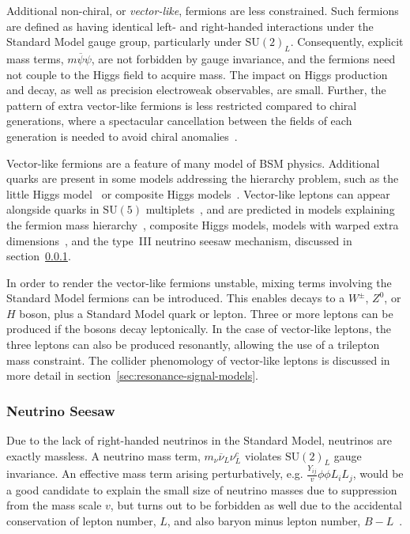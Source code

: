 Additional non-chiral, or \emph{vector-like}, fermions are less constrained. Such fermions are defined as having identical left- and right-handed interactions under the Standard Model gauge group, particularly under $\mathrm{SU}(2)_L$. Consequently, explicit mass terms, $m\overline{\psi}\psi$, are not forbidden by gauge invariance, and the fermions need not couple to the Higgs field to acquire mass. The impact on Higgs production and decay, as well as precision electroweak observables, are small. Further, the pattern of extra vector-like fermions is less restricted compared to chiral generations, where a spectacular cancellation between the fields of each generation is needed to avoid chiral anomalies~\cite{Geng:1988pr}. 

Vector-like fermions are a feature of many model of BSM physics. Additional quarks are present in some models addressing the hierarchy problem, such as the little Higgs model~\cite{Arkani-Hamed:557546} or composite Higgs models~\cite{Kaplan:148688}. Vector-like leptons can appear alongside quarks in $\mathrm{SU}(5)$ multiplets~\cite{Martin:2012dx}, and are predicted in models explaining the fermion mass hierarchy~\cite{Falkowski:2014hs}, composite Higgs models, models with warped extra dimensions~\cite{Redi:2013ib,Contino:1005586}, and the type~III neutrino seesaw mechanism, discussed in section~\ref{sec:theory-bsm-seesaw}. 

In order to render the vector-like fermions unstable, mixing terms involving the Standard Model fermions can be introduced. This enables decays to a $W^{\pm}$, $Z^0$, or $H$ boson, plus a Standard Model quark or lepton. Three or more leptons can be produced if the bosons decay leptonically. In the case of vector-like leptons, the three leptons can also be produced resonantly, allowing the use of a trilepton mass constraint. The collider phenomology of vector-like leptons is discussed in more detail in section~\ref{sec:resonance-signal-models}.



\subsubsection{Neutrino Seesaw}\label{sec:theory-bsm-seesaw}
Due to the lack of right-handed neutrinos in the Standard Model, neutrinos are exactly massless. A neutrino mass term, $m_{\nu} \overline{\nu}_L \nu_L^c$ violates $\mathrm{SU}(2)_L$ gauge invariance. An effective mass term arising perturbatively, e.g. $\frac{Y_{ij}}{v}\phi\phi L_i L_j$, would be a good candidate to explain the small size of neutrino masses due to suppression from the mass scale $v$, but turns out to be forbidden as well due to the accidental conservation of lepton number, $L$, and also baryon minus lepton number, $B-L$~\cite{RevModPhys.75.345}. 

